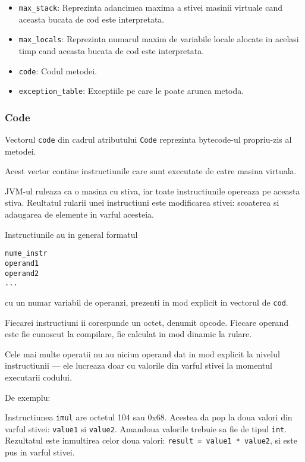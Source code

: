 \begin{itemize}
	\tightlist
	\item
	      \texttt{max\_stack}: Reprezinta adancimea maxima a stivei masinii
	      virtuale cand aceasta bucata de cod este interpretata.
	\item
	      \texttt{max\_locals}: Reprezinta numarul maxim de variabile locale
	      alocate in acelasi timp cand aceasta bucata de cod este interpretata.
	\item
	      \texttt{code}: Codul metodei.
	\item
	      \texttt{exception\_table}: Exceptiile pe care le poate arunca metoda.
\end{itemize}

\subsubsection{Code}

Vectorul \texttt{code} din cadrul atributului \texttt{Code} reprezinta
bytecode-ul propriu-zis al metodei.

Acest vector contine instructiunile care sunt executate de catre masina
virtuala.

JVM-ul ruleaza ca o masina cu stiva, iar toate instructiunile opereaza
pe aceasta stiva. Reultatul rularii unei instructiuni este modificarea
stivei: scoaterea si adaugarea de elemente in varful acesteia.

Instructiunile au in general formatul~\cite{instruction_format}

\begin{verbatim}
nume_instr
operand1
operand2
...
\end{verbatim}

cu un numar variabil de operanzi, prezenti in mod explicit in vectorul
de \texttt{cod}.

Fiecarei instructiuni ii corespunde un octet, denumit opcode. Fiecare
operand este fie cunoscut la compilare, fie calculat in mod dinamic la
rulare.

Cele mai multe operatii nu au niciun operand dat in mod explicit la
nivelul instructiunii --- ele lucreaza doar cu valorile din varful stivei
la momentul executarii codului.

De exemplu:

Instructiunea \texttt{imul} are octetul 104 sau 0x68.
Acestea da pop la doua valori din varful stivei: \texttt{value1} si
\texttt{value2}. Amandoua valorile trebuie sa fie de tipul \texttt{int}.
Rezultatul este inmultirea celor doua valori:
\texttt{result\ =\ value1\ *\ value2}, si este pus in varful stivei.

